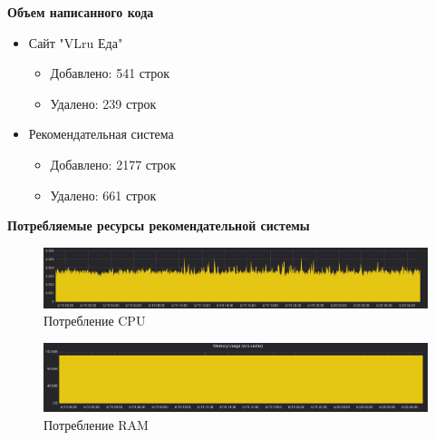 \textbf{Объем написанного кода}

\begin{itemize}
  \item Сайт "VLru Еда"
    \begin{itemize}
      \item Добавлено: 541 строк
      \item Удалено: 239 строк
    \end{itemize}
  \item Рекомендательная система
    \begin{itemize}
      \item Добавлено: 2177 строк
      \item Удалено: 661 строк
    \end{itemize}
\end{itemize}

\textbf{Потребляемые ресурсы рекомендательной системы}

\begin{figure}[H]
    \centering
    \includegraphics[scale=0.3]{images/cpu_usage.png}
    \caption{Потребление CPU}
\end{figure}

\begin{figure}[H]
    \centering
    \includegraphics[scale=0.3]{images/ram_usage.png}
    \caption{Потребление RAM}
\end{figure}
